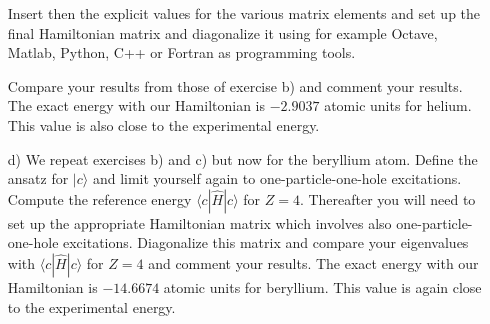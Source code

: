 \begin{prob}
\begin{enumerate}
Insert then the explicit values for the various matrix elements and 
set up the final Hamiltonian matrix and diagonalize it using for example
Octave, Matlab, Python, C++ or Fortran as programming tools.

Compare your results from those of exercise b) and comment your results. 
The exact energy with our Hamiltonian is $-2.9037$ atomic units for helium. This value is also close to the experimental energy.
\item[d)] We repeat exercises b) and c) but now for the beryllium atom.
Define the ansatz for $|c\rangle$ and limit yourself again to one-particle-one-hole excitations.   Compute the reference energy 
$\langle c | \hat{H}| c \rangle $ for $Z=4$.  
Thereafter you will need to set up the appropriate Hamiltonian matrix
which involves also one-particle-one-hole excitations. Diagonalize this matrix
and compare your eigenvalues with $\langle c | \hat{H}| c \rangle$ for $Z=4$ and comment your results. 
The exact energy with our Hamiltonian is $-14.6674$ atomic units for beryllium. This value is again close to the experimental energy.
\end{enumerate}


\end{prob}

